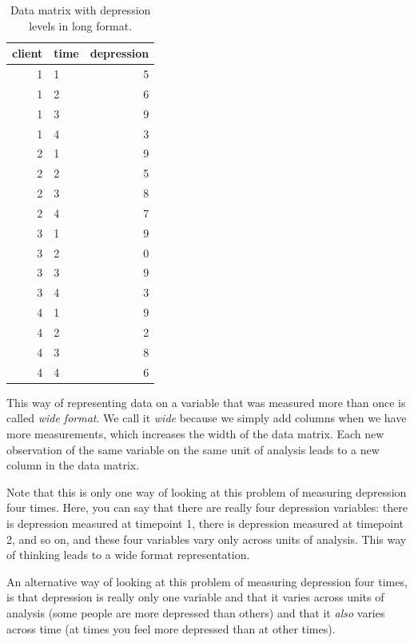 \documentclass[]{book}\usepackage[]{graphicx}\usepackage[]{color}
\begin{document}
\begin{table}[ht]
\centering
\caption{Data matrix with depression levels in long format.} 
\label{tab:data_8}
\begin{tabular}{rlr}
  \hline
client & time & depression \\ 
  \hline
1 & 1 & 5 \\ 
  1 & 2 & 6 \\ 
  1 & 3 & 9 \\ 
  1 & 4 & 3 \\ 
  2 & 1 & 9 \\ 
  2 & 2 & 5 \\ 
  2 & 3 & 8 \\ 
  2 & 4 & 7 \\ 
  3 & 1 & 9 \\ 
  3 & 2 & 0 \\ 
  3 & 3 & 9 \\ 
  3 & 4 & 3 \\ 
  4 & 1 & 9 \\ 
  4 & 2 & 2 \\ 
  4 & 3 & 8 \\ 
  4 & 4 & 6 \\ 
   \hline
\end{tabular}
\end{table}



This way of representing data on a variable that was measured more than once is called \textit{wide format}. We call it \textit{wide} because we simply add columns when we have more measurements, which increases the width of the data matrix. Each new observation of the same variable on the same unit of analysis leads to a new column in the data matrix.

Note that this is only one way of looking at this problem of measuring depression four times. Here, you can say that there are really four depression variables: there is depression measured at timepoint 1, there is depression measured at timepoint 2, and so on, and these four variables vary only across units of analysis. This way of thinking leads to a wide format representation.

An alternative way of looking at this problem of measuring depression four times, is that depression is really only one variable and that it varies across units of analysis (some people are more depressed than others) and that it \textit{also} varies across time (at times you feel more depressed than at other times).
\end{document}
